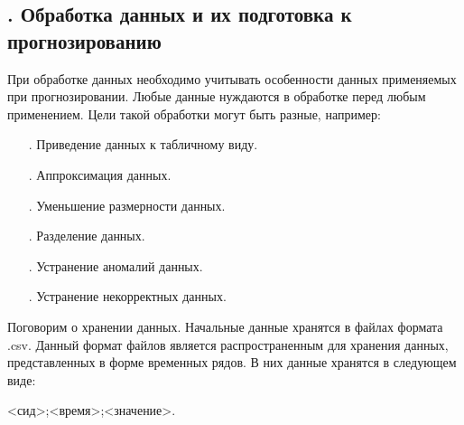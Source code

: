 \titlespace

\subsection*{ 
  \gostTitleFont
  \redline
  \thechaptercntr .\thesubchaptercntr \spc
  Обработка данных и их подготовка к прогнозированию
} \addtocounter{subchaptercntr}{1}

\titlespace

{\gostFont

  \par \redline При обработке данных необходимо учитывать особенности данных применяемых при прогнозировании. Любые данные нуждаются в обработке перед любым применением.  Цели такой обработки могут быть разные, например: 
  
  \begin{itemize}[leftmargin=2.15cm, labelwidth=0.65cm, labelsep=0.0cm] 
  	
  	\item[\theitemcntr. ] Приведение данных к табличному виду.
  	\addtocounter{itemcntr}{1}
  	
  	\item[\theitemcntr. ] Аппроксимация данных.
  	\addtocounter{itemcntr}{1}
  	
  	\item[\theitemcntr. ] Уменьшение размерности данных.
  	\addtocounter{itemcntr}{1}
  	
  	\item[\theitemcntr. ] Разделение данных.
  	\addtocounter{itemcntr}{1}
  	
  	\item[\theitemcntr. ] Устранение аномалий данных.
  	\addtocounter{itemcntr}{1}
  	
  	\item[\theitemcntr. ] Устранение некорректных данных.
  	\addtocounter{itemcntr}{1}
  	
  	\setcounter{itemcntr}{1}
  \end{itemize}

  \par \redline Поговорим о хранении данных. Начальные данные хранятся в файлах формата .csv. Данный формат файлов является распространенным для хранения данных, представленных в форме временных рядов. В них данные хранятся в следующем виде: 
  
  \begin{Center}
  <сид>;<время>;<значение>. 
  \end{Center}

}
